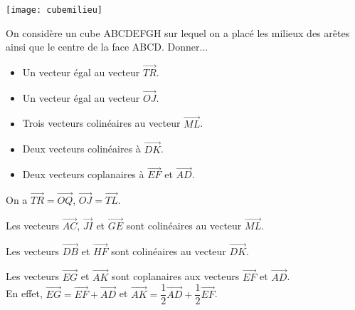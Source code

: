 \documentclass[11pt,fleqn, openany]{book} %
\begin{document}
\begin{exercise}[topic=geo01]
\vskip10pt

\begin{minipage}{0.3\linewidth}
 \begin{center}
\texttt{[image: cubemilieu]}
\end{center}
\end{minipage}\hfill\begin{minipage}{0.6\linewidth}
On considère un cube ABCDEFGH sur lequel on a placé les milieux des arêtes ainsi que le centre de la face ABCD. Donner...
\begin{itemize}
\item Un vecteur égal au vecteur $\overrightarrow{TR}$.
\item Un vecteur égal au vecteur $\overrightarrow{OJ}$.
\item Trois vecteurs colinéaires au vecteur $\overrightarrow{ML}$.
\item Deux vecteurs colinéaires à $\overrightarrow{DK}$.
\item Deux vecteurs coplanaires à $\overrightarrow{EF}$ et $\overrightarrow{AD}$.
\end{itemize}\end{minipage}
\vspace{-0.5cm}\end{exercise}

\begin{solution}On a $\overrightarrow{TR}=\overrightarrow{OQ}$,  $\overrightarrow{OJ}=\overrightarrow{TL}$.

Les vecteurs $\overrightarrow{AC}$, $\overrightarrow{JI}$ et $\overrightarrow{GE}$ sont colinéaires au vecteur $\overrightarrow{ML}$.

Les vecteurs $\overrightarrow{DB}$ et $\overrightarrow{HF}$ sont colinéaires au vecteur $\overrightarrow{DK}$.

Les vecteurs $\overrightarrow{EG}$ et $\overrightarrow{AK}$ sont coplanaires aux vecteurs $\overrightarrow{EF}$ et $\overrightarrow{AD}$. \\ En effet, $\overrightarrow{EG}=\overrightarrow{EF}+\overrightarrow{AD}$ et $\overrightarrow{AK}=\dfrac{1}{2}\overrightarrow{AD}+\dfrac{1}{2}\overrightarrow{EF}$.\end{solution}
\end{document}
